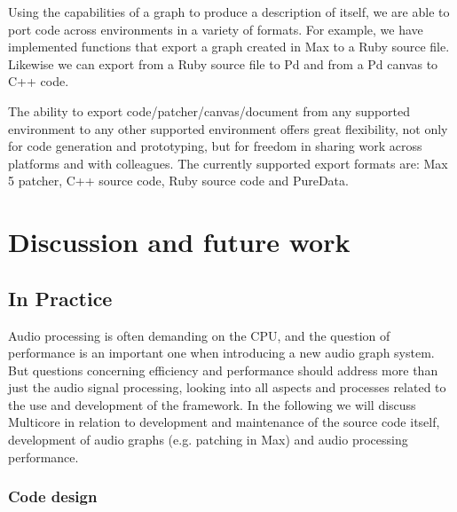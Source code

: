 \documentclass[twoside,a4paper]{article}
\begin{document}
Using the capabilities of a graph to produce a description of itself, we are able to port code across environments in a variety of formats.  
For example, we have implemented functions that export a graph created in Max to a Ruby source file.  
Likewise we can export from a Ruby source file to Pd and from a Pd canvas to C++ code.  

The ability to export code/patcher/canvas/document from any supported environment to any other supported environment offers great flexibility, not only for code generation and prototyping, but for freedom in sharing work across platforms and with colleagues.  
The currently supported export formats are: Max 5 patcher, C++ source code, Ruby source code and PureData.






%
\section{Discussion and future work} %
%

\subsection{In Practice} %

Audio processing is often demanding on the CPU, and the question of performance is an important one when introducing a new audio graph system.
But questions concerning efficiency and performance should address more than just the audio signal processing, looking into all aspects and processes related to the use and development of the framework.
In the following we will discuss Multicore in relation to development and maintenance of the source code itself, development of audio graphs (e.g. patching in Max) and audio processing performance.



\subsubsection{Code design} %
\end{document}
